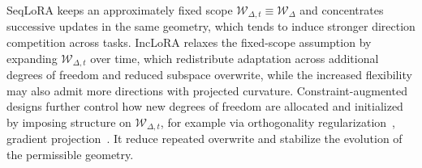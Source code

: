 \documentclass[10pt]{article} %
\begin{document}
SeqLoRA keeps an approximately fixed scope $\mathcal W_{\Delta,t}\equiv\mathcal W_\Delta$ and concentrates successive updates in the same geometry, which tends to induce stronger direction competition across tasks.
IncLoRA relaxes the fixed-scope assumption by expanding $\mathcal W_{\Delta,t}$ over time, which redistribute adaptation across additional degrees of freedom and reduced subspace overwrite, while the increased flexibility may also admit more directions with projected curvature.
Constraint-augmented designs further control how new degrees of freedom are allocated and initialized by imposing structure on $\mathcal W_{\Delta,t}$, for example via orthogonality regularization~\cite{wang2023orthogonal}, gradient projection~\citep{liangInfLoRAInterferenceFreeLowRank2024a,yang2024parametercollisionhinderingcontinual}.
It reduce repeated overwrite and stabilize the evolution of the permissible geometry.
















\end{document}
